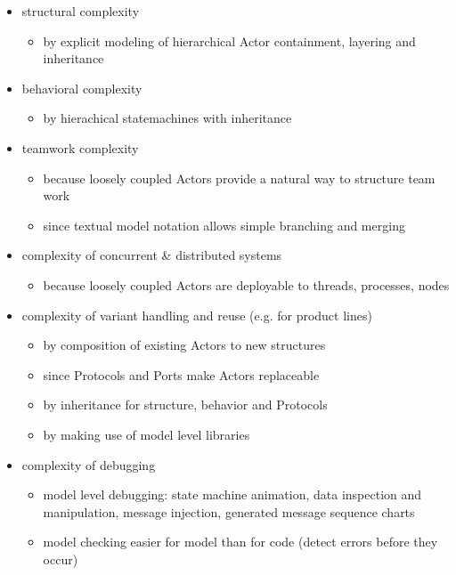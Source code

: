 \begin{itemize}
 \item structural complexity
	\begin{itemize}
\item by explicit modeling of hierarchical Actor containment, layering and inheritance \end{itemize}
\item behavioral complexity
\begin{itemize}
\item by hierachical statemachines with inheritance \end{itemize}
\item teamwork complexity
	\begin{itemize}
\item because loosely coupled Actors provide a natural way to structure team work
\item since textual model notation allows simple branching and merging \end{itemize}
\item complexity of concurrent \& distributed systems
	\begin{itemize}
\item because loosely coupled Actors are deployable to threads, processes, nodes \end{itemize}
\item complexity of variant handling and reuse (e.g. for product lines)
	\begin{itemize}
\item by composition of existing Actors to new structures
\item since Protocols and Ports make Actors replaceable
\item by inheritance for structure, behavior and Protocols
\item by making use of model level libraries  \end{itemize}
\item complexity of debugging
	 \begin{itemize}
\item model level debugging: state machine animation, data inspection and manipulation, message injection, 
generated message sequence charts
\item model checking easier for model than for code (detect errors before they occur)  \end{itemize}
\end{itemize}
